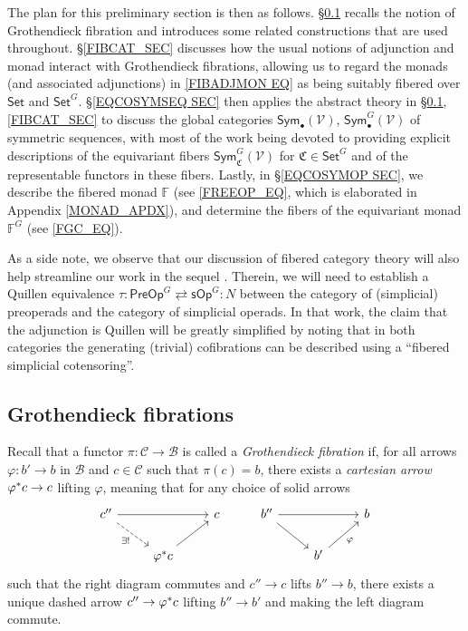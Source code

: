 \documentclass[a4paper,10pt
,draft
]{article}%
\numberwithin{equation}{section}
\numberwithin{figure}{section}
\theoremstyle{definition} %
\newcommand{\V}{\ensuremath{\mathcal V}}
\newcommand{\1}{\ensuremath{\mathbbm 1}}%
\begin{document}
The plan for this preliminary section is then as follows.
%
\S \ref{GROTFIB SEC} recalls the notion of Grothendieck fibration and
introduces some related constructions that are used throughout.
%
\S \ref{FIBCAT_SEC} discusses how the usual notions of adjunction and monad interact with Grothendieck fibrations,
allowing us to regard the monads
(and associated adjunctions)
in \eqref{FIBADJMON EQ}
as being suitably fibered over $\mathsf{Set}$ and $\mathsf{Set}^G$.
%
\S \ref{EQCOSYMSEQ SEC} then applies the abstract theory in 
\S \ref{GROTFIB SEC},\ref{FIBCAT_SEC}
to discuss the global categories
$\mathsf{Sym}_{\bullet}(\V)$,
$\mathsf{Sym}^G_{\bullet}(\V)$
of symmetric sequences, 
with most of the work being devoted to providing 
explicit descriptions of the equivariant fibers
$\mathsf{Sym}^G_{\mathfrak{C}}(\V)$
for $\mathfrak{C} \in \mathsf{Set}^G$
and of the representable functors in these fibers.
%
Lastly, in \S \ref{EQCOSYMOP SEC}, 
we describe the fibered monad $\mathbb F$ 
(see \eqref{FREEOP_EQ}, which is elaborated in Appendix \ref{MONAD_APDX}),
and determine the fibers of the equivariant monad $\mathbb F^G$ (see \eqref{FGC_EQ}).


As a side note, we observe that our discussion of fibered category theory will
also help streamline our work in the sequel \cite{BP_TAS}.
Therein, we will need to establish a Quillen equivalence
$\tau \colon \mathsf{PreOp}^G \rightleftarrows \mathsf{sOp}^G\colon N$
between the category of (simplicial) preoperads and
the category of simplicial operads.
In that work, the claim that the adjunction is Quillen 
will be greatly simplified by noting that in both categories 
the generating (trivial) cofibrations
can be described using a ``fibered simplicial cotensoring''.




\subsection{Grothendieck fibrations}\label{GROTFIB SEC}


Recall that a functor 
$\pi \colon \mathcal{C} \to \mathcal{B}$
is called a \emph{Grothendieck fibration} if,
for all arrows
$\varphi \colon b' \to b$ in $\mathcal{B}$
and $c \in \mathcal{C}$ such that $\pi(c) = b$,
there exists a \emph{cartesian arrow}
$\varphi^{\**}c \to c$
lifting $\varphi$,
meaning that for any choice of solid arrows
\begin{equation}\label{CARTARDEF EQ}
\begin{tikzcd}
c'' \ar{rr} \ar[dashed]{rd}[swap]{\exists!} 
&&
c
&%
b'' \ar{rr} \ar{rd} 
&&
b
\\
& \varphi^{\**} c \ar{ru}
&
&%
& b'\ar{ru}[swap]{\varphi}
&
\end{tikzcd}
\end{equation}
such that the right diagram commutes and 
$c'' \to c$ lifts $b'' \to b$,
there exists a unique dashed arrow
$c'' \to \varphi^{\**} c$ lifting $b'' \to b'$
and making the left diagram commute.
\end{document}
